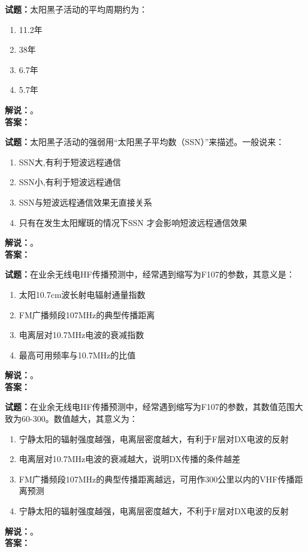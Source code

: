 \documentclass{ctexbook}
\begin{document}
\vspace{\baselineskip}

\noindent\textbf{试题：}太阳黑子活动的平均周期约为：
\begin{enumerate}[leftmargin=3em]
  \item 11.2年
  \item 38年
  \item 6.7年
  \item 5.7年
\end{enumerate}
\noindent\textbf{解说：}\textbf{}。\\\noindent\textbf{答案：}

\vspace{\baselineskip}

\noindent\textbf{试题：}太阳黑子活动的强弱用“太阳黑子平均数（SSN）”来描述。一般说来：
\begin{enumerate}[leftmargin=3em]
  \item SSN大,有利于短波远程通信
  \item SSN小,有利于短波远程通信
  \item SSN与短波远程通信效果无直接关系
  \item 只有在发生太阳耀斑的情况下SSN 才会影响短波远程通信效果
\end{enumerate}
\noindent\textbf{解说：}\textbf{}。\\\noindent\textbf{答案：}

\vspace{\baselineskip}

\noindent\textbf{试题：}在业余无线电HF传播预测中，经常遇到缩写为F107的参数，其意义是：
\begin{enumerate}[leftmargin=3em]
  \item 太阳10.7cm波长射电辐射通量指数
  \item FM广播频段107\unit{\MHz}的典型传播距离
  \item 电离层对10.7\unit{\MHz}电波的衰减指数
  \item 最高可用频率与10.7\unit{\MHz}的比值
\end{enumerate}
\noindent\textbf{解说：}\textbf{}。\\\noindent\textbf{答案：}

\vspace{\baselineskip}

\noindent\textbf{试题：}在业余无线电HF传播预测中，经常遇到缩写为F107的参数，其数值范围大致为60-300。数值越大，其意义为：
\begin{enumerate}[leftmargin=3em]
  \item 宁静太阳的辐射强度越强，电离层密度越大，有利于F层对DX电波的反射
  \item 电离层对10.7\unit{\MHz}电波的衰减越大，说明DX传播的条件越差
  \item FM广播频段107\unit{\MHz}的典型传播距离越远，可用作300公里以内的VHF传播距离预测
  \item 宁静太阳的辐射强度越强，电离层密度越大，不利于F层对DX电波的反射
\end{enumerate}
\noindent\textbf{解说：}\textbf{}。\\\noindent\textbf{答案：}
\end{document}
